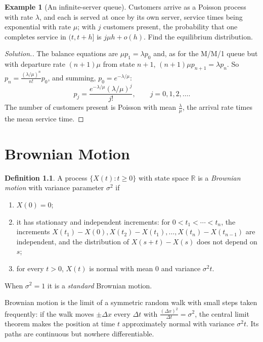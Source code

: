 \documentclass[12pt,a4paper]{report}
\theoremstyle{definition}
\newtheorem{defn}[thm]{Definition}
\newtheorem{exa}[thm]{Example}
\newenvironment{solution}
  {\renewcommand{\qedsymbol}{}\begin{proof}[\textit{Solution}.]}
  {\end{proof}}
\begin{document}
\begin{exa}[An infinite-server queue]
\label{ex:infiniteserver}
Customers arrive as a Poisson process with rate $\lambda$, and each is served at once by its own
server, service times being exponential with rate $\mu$; with $j$ customers present, the
probability that one completes service in $(t, t + h]$ is $j\mu h + o(h)$. Find the equilibrium
distribution.
\end{exa}

\begin{solution}
The balance equations are $\mu p_1 = \lambda p_0$ and, as for the M/M/1 queue but with departure rate
$(n + 1)\mu$ from state $n + 1$, $(n + 1)\mu p_{n+1} = \lambda p_n$. So
$p_n = \frac{(\lambda/\mu)^n}{n!}p_0$, and summing, $p_0 = e^{-\lambda/\mu}$:
\[p_j = \frac{e^{-\lambda/\mu}(\lambda/\mu)^j}{j!},\qquad j = 0, 1, 2, \dots .\]
The number of customers present is Poisson with mean $\frac\lambda\mu$, the arrival rate times the mean
service time.
\end{solution}

\chapter{Brownian Motion}
\label{ch:brownian}

\begin{defn}
\label{def:brownian}
A process $\{X(t) : t\geq 0\}$ with state space $\mathbb{R}$ is a \emph{Brownian motion} with variance
parameter $\sigma^2$ if
\begin{enumerate}
\item[(i)] $X(0) = 0$;
\item[(ii)] it has stationary and independent increments: for $0<t_1<\cdots<t_n$, the increments
$X(t_1) - X(0), X(t_2) - X(t_1), \dots, X(t_n) - X(t_{n-1})$ are independent, and the distribution of
$X(s + t) - X(s)$ does not depend on $s$;
\item[(iii)] for every $t>0$, $X(t)$ is normal with mean $0$ and variance $\sigma^2t$.
\end{enumerate}
When $\sigma^2 = 1$ it is a \emph{standard} Brownian motion.
\end{defn}

Brownian motion is the limit of a symmetric random walk with small steps taken frequently: if
the walk moves $\pm\Delta x$ every $\Delta t$ with $\frac{(\Delta x)^2}{\Delta t} = \sigma^2$, the central limit
theorem makes the position at time $t$ approximately normal with variance $\sigma^2t$. Its paths are
continuous but nowhere differentiable.
\end{document}
